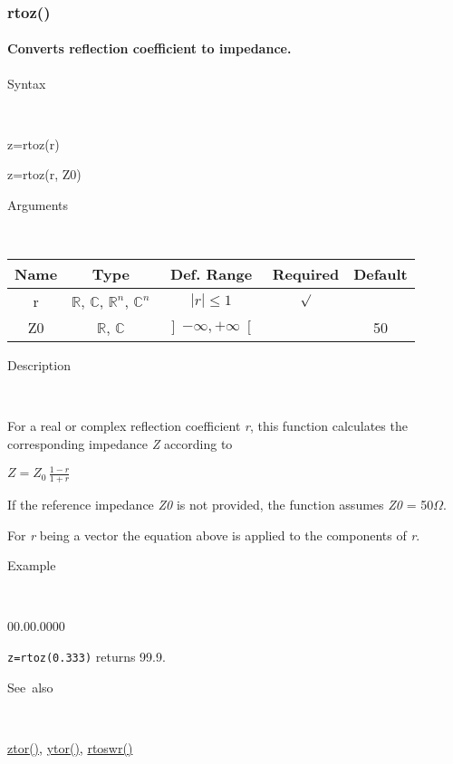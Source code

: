 \newpage
\subsubsection*{\hypertarget{rtoz}{}{\Large rtoz()}}


\paragraph{\label{par:rtoz}Converts reflection coefficient to impedance.}

\begin{description}
\item [Syntax]~
\end{description}
z=rtoz(r)

\noindent z=rtoz(r, Z0)

\begin{description}
\item [Arguments]~
\end{description}
\begin{tabular}{|c|c|c|c|c|}
\hline 
Name&
Type&
Def. Range&
Required&
Default\tabularnewline
\hline
\hline 
r&
$\mathbb{R}$, $\mathbb{C}$, $\mathbb{R}^{n}$, $\mathbb{C}^{n}$&
$\left|r\right|\leq1$&
$\surd$&
\tabularnewline
\hline
Z0&
$\mathbb{R}$, $\mathbb{C}$&
$\left]-\infty,+\infty\right[$&
&
50\tabularnewline
\hline
\end{tabular}

\begin{description}
\item [Description]~
\end{description}
For a real or complex reflection coefficient \textit{r}, this function
calculates the corresponding impedance \textit{Z} according to 

\medskip{}
$Z={\displaystyle Z_{0}\,\frac{1-r}{1+r}}$
\medskip{}

\noindent If the reference impedance \textit{Z0} is not provided,
the function assumes \textit{Z0} = 50$\Omega$.

\noindent For \textit{r} being a vector the equation above is applied
to the components of \textit{r}.

\begin{description}
\item [Example]~
\end{description}
\begin{lyxlist}{00.00.0000}
\item [\texttt{z=rtoz(0.333)}]returns 99.9.
\end{lyxlist}
\begin{description}
\item [See~also]~
\end{description}
\textcolor{blue}{\hyperlink{ztor}{ztor()}}\textcolor{black}{,} \textcolor{blue}{\hyperlink{ytor}{ytor()}}\textcolor{black}{,}
\textcolor{blue}{\hyperlink{rtoswr}{rtoswr()}}


